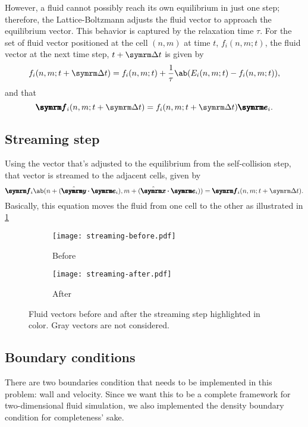 However, a fluid cannot possibly reach its own equilibrium in just one step; therefore, the Lattice-Boltzmann adjusts the fluid vector to approach the equilibrium vector. This behavior is captured by the relaxation time $\tau$. For the set of fluid vector positioned at the cell $(n, m)$ at time $t$, $f_i(n, m; t)$, the fluid vector at the next time step, $t + \Dd{t}$ is given by
\begin{equation}
	f_i(n, m; t + \Dd{t}) = f_i(n, m; t) + \frac{1}{\tau}\ab(E_i(n, m; t) - f_i(n, m; t)),
\end{equation}
and that
\begin{equation}
	\vv{f}_i(n, m; t + \Dd{t}) = f_i(n, m; t + \Dd{t})\vv{e}_i.
\end{equation}

\subsection{Streaming step}

Using the vector that's adjusted to the equilibrium from the self-collision step, that vector is streamed to the adjacent cells, given by
\begin{equation}
	\vv{f}_i\ab(n + (\yhat \vdot \vv{e}_i), m + (\xhat \vdot \vv{e}_i)) = \vv{f}_i(n, m; t + \Dd{t}).
\end{equation}
Basically, this equation moves the fluid from one cell to the other as illustrated in \cref{fig:streaming-step}
\begin{figure}
	\centering
	\begin{subfigure}{0.45\textwidth}
		\centering
		\texttt{[image: streaming-before.pdf]}
		\caption{Before}
	\end{subfigure}
	\begin{subfigure}{0.45\textwidth}
		\centering
		\texttt{[image: streaming-after.pdf]}
		\caption{After}
	\end{subfigure}
	\caption{Fluid vectors before and after the streaming step highlighted in color. Gray vectors are not considered.}
	\label{fig:streaming-step}
\end{figure}

\subsection{Boundary conditions}

There are two boundaries condition that needs to be implemented in this problem: wall and velocity. Since we want this to be a complete framework for two-dimensional fluid simulation, we also implemented the density boundary condition for completeness' sake.

